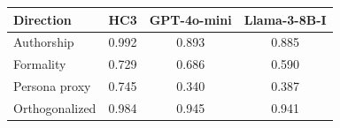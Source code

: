 \begin{tabular}{lccc}
\toprule
Direction & HC3 & GPT-4o-mini & Llama-3-8B-I \\
\midrule
Authorship & 0.992 & 0.893 & 0.885 \\
Formality & 0.729 & 0.686 & 0.590 \\
Persona proxy & 0.745 & 0.340 & 0.387 \\
Orthogonalized & 0.984 & 0.945 & 0.941 \\
\bottomrule
\end{tabular}
